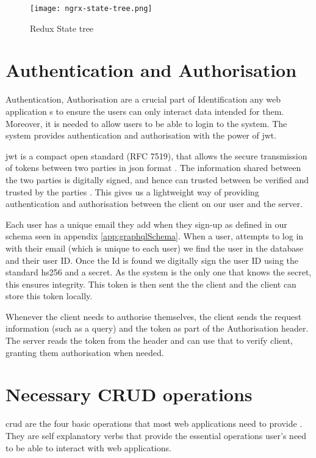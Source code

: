 \begin{figure}[htb!]
    \centering
    \texttt{[image: ngrx-state-tree.png]}
    \caption{Redux State tree}
    \label{fig:reduxStateTree}
\end{figure}

\section{Authentication and Authorisation}
Authentication, Authorisation  are a crucial part of Identification any web application s to ensure the users can only interact data intended for them. Moreover, it is needed to allow users to be able to login to the system. The system provides authentication and authorisation with the power of \acrfull{jwt}.

\acrshort{jwt} is a compact open standard (RFC 7519), that allows the secure transmission of tokens between two parties in  \acrshort{json} format \cite{jones2015json}. The information shared between the two parties is digitally signed, and hence can trusted between be verified and trusted by the parties \cite{auth02019json}. This gives us a lightweight way of providing authentication and authorisation between the client on our user and the server.

Each user has a unique email they add when they sign-up as defined in our schema seen in appendix \ref{app:graphqlSchema}. When a user, attempts to log in with their email (which is unique to each user) we find the user in the database and their user ID. Once the Id is found we digitally sign the user ID using the standard \acrfull{hs256} and a secret. As the system is the only one that knows the secret, this ensures integrity. This token is then sent the the client and the client can store this token locally.

Whenever the client needs to authorise themselves, the client sends the request information (such as a query) and the token as part of the Authorisation header. The server reads the token from the header and can use that to verify client, granting them authorisation when needed.

\section{Necessary CRUD operations} \label{sec:ExtraFeatures}
\acrfull{crud} are the four basic operations that most web applications need to provide \cite{codeacademy2019crud}. They are self explanatory verbs that provide the essential operations user's need to be able to interact with web applications.

